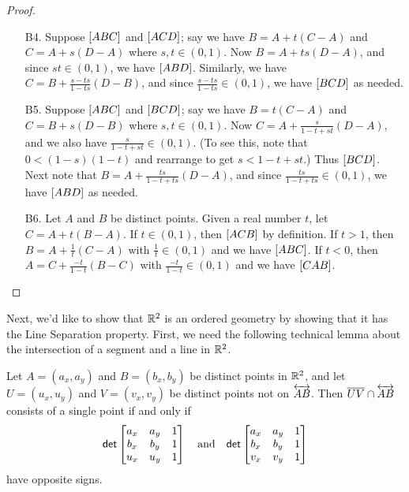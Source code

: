 \begin{proof}
\begin{itemize}
\item[B4.] Suppose \([ A B C ]\) and \([ A C D ]\); say we have \(B = A + t(C-A)\) and \(C = A + s(D-A)\) where \(s,t \in (0,1)\).
Now \(B = A + ts(D-A)\), and since \(st \in (0,1)\), we have \([ A B D ]\).
Similarly, we have \(C = B + \frac{s-ts}{1-ts}(D-B)\), and since \(\frac{s-ts}{1-ts} \in (0,1)\), we have \([ B C D ]\) as needed.

\item[B5.] Suppose \([ A B C ]\) and \([ B C D ]\); say we have \(B = t(C-A)\) and \(C = B + s(D-B)\) where \(s,t \in (0,1)\).
Now \(C = A + \frac{s}{1-t+st}(D-A)\), and we also have \(\frac{s}{1-t+st} \in (0,1)\).
(To see this, note that \(0 < (1-s)(1-t)\) and rearrange to get \(s < 1-t+st\).)
Thus \([ B C D ]\).
Next note that \(B = A + \frac{ts}{1-t+ts}(D-A)\), and since \(\frac{ts}{1-t+ts} \in (0,1)\), we have \([ A B D ]\) as needed.

\item[B6.] Let \(A\) and \(B\) be distinct points.
Given a real number \(t\), let \(C = A + t(B-A)\).
If \(t \in (0,1)\), then \([ A C B ]\) by definition.
If \(t > 1\), then \(B = A + \frac{1}{t}(C-A)\) with \(\frac{1}{t} \in (0,1)\) and we have \([ A B C ]\).
If \(t < 0\), then \(A = C + \frac{-t}{1-t}(B-C)\) with \(\frac{-t}{1-t} \in (0,1)\) and we have \([ C A B ]\).
\qedhere
\end{itemize}
\end{proof}

Next, we'd like to show that \(\mathbb{R}^2\) is an ordered geometry by showing that it has the Line Separation property.
First, we need the following technical lemma about the intersection of a segment and a line in \(\mathbb{R}^2\).

\begin{lem}\label{lem:rr2-opp-side-incidence}
Let \(A = (a_x,a_y)\) and \(B = (b_x,b_y)\) be distinct points in \(\mathbb{R}^2\), and let \(U = (u_x, u_y)\) and \(V = (v_x, v_y)\) be distinct points not on \(\overleftrightarrow{AB}\).
Then \(\overline{UV} \cap \overleftrightarrow{AB}\) consists of a single point if and only if \[ \mathsf{det} \begin{bmatrix} a_x & a_y & 1 \\ b_x & b_y & 1 \\ u_x & u_y & 1 \end{bmatrix} \quad \mathrm{and} \quad \mathsf{det} \begin{bmatrix} a_x & a_y & 1 \\ b_x & b_y & 1 \\ v_x & v_y & 1 \end{bmatrix} \] have opposite signs.
\end{lem}

